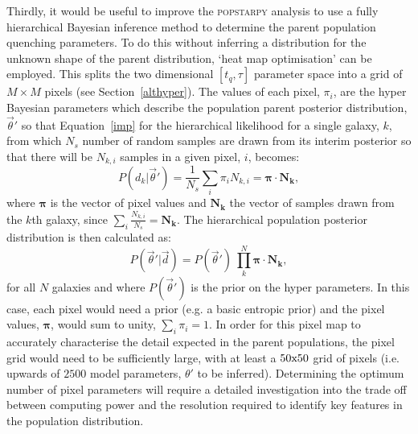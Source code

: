 Thirdly, it would be useful to improve the \textsc{popstarpy} analysis to use a fully hierarchical Bayesian inference method to determine the parent population quenching parameters. To do this without inferring a distribution for the unknown shape of the parent distribution, `heat map optimisation' can be employed. This splits the two dimensional $[t_q, \tau]$ parameter space into a grid of $M \times M$ pixels (see Section~\ref{althyper}). The values of each pixel, $\pi_i$, are the hyper Bayesian parameters which describe the population parent posterior distribution, $\vec{\theta}'$ so that Equation~\ref{imp} for the hierarchical likelihood for a single galaxy, $k$, from which $N_s$ number of random samples are drawn from its interim posterior so that there will be $N_{k,i}$ samples in a given pixel, $i$, becomes:
\begin{equation}\label{eq:heatmap}
P(d_k|\vec{\theta}')  = \frac{1}{N_s} \sum_i \pi_i N_{k,i} = \boldsymbol{\pi} \cdot \boldsymbol{N_k},
\end{equation}
where $\boldsymbol{\pi}$ is the vector of pixel values and $\boldsymbol{N_k}$ the vector of samples drawn from the $k$th galaxy, since $\sum_i \frac{N_{k,i}}{N_s} = \boldsymbol{N_k}$. The hierarchical population posterior distribution is then calculated as:
\begin{equation}\label{eq:parentdist}
P(\vec{\theta}'|\vec{d}) = P(\vec{\theta}')~\prod_k^N \boldsymbol{\pi} \cdot \boldsymbol{N_k},
\end{equation}
for all $N$ galaxies and where $P(\vec{\theta}')$ is the prior on the hyper parameters. In this case, each pixel would need a prior (e.g. a basic entropic prior) and the pixel values, $\boldsymbol{\pi}$, would sum to unity, $\sum_i \pi_i = 1$. In order for this pixel map to accurately characterise the detail expected in the parent populations, the pixel grid would need to be sufficiently large, with at least a $50\rm{x}50$ grid of pixels (i.e. upwards of $2500$ model parameters, $\theta'$ to be inferred). Determining the optimum number of pixel parameters will require a detailed investigation into the trade off between computing power and the resolution required to identify key features in the population distribution. 

